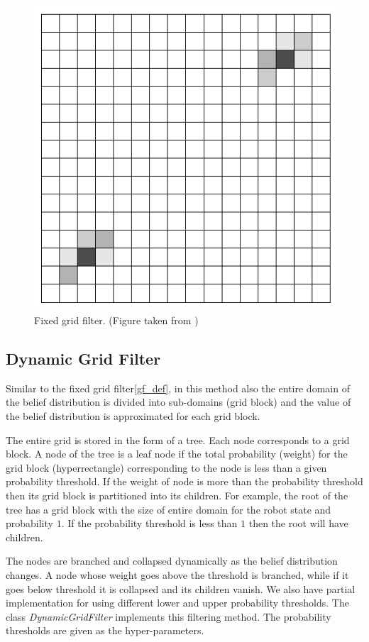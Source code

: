 \begin{figure}
\caption{Fixed grid filter. (Figure taken from \cite{prob})}
\includegraphics[width=\linewidth]{grid}
\end{figure}

\subsection{Dynamic Grid Filter}
Similar to the fixed grid filter\ref{gf_def}, in this method also the entire domain of the belief distribution is divided into sub-domains (grid block) and the value of the belief distribution is approximated for each grid block.

The entire grid is stored in the form of a tree. Each node corresponds to a grid block. A node of the tree is a leaf node if the total probability (weight) for the grid block (hyperrectangle) corresponding to the node is less than a given probability threshold. If the weight of node is more than the probability threshold then its grid block is partitioned into its children. For example, the root of the tree has a grid block with the size of entire domain for the robot state and probability $1$. If the probability threshold is less than $1$ then the root will have children.

The nodes are branched and collapsed dynamically as the belief distribution changes. A node whose weight goes above the threshold is branched, while if it goes below threshold it is collapsed and its children vanish. We also have partial implementation for using different lower and upper probability thresholds. The class \textit{DynamicGridFilter} implements this filtering method. The probability thresholds are given as the hyper-parameters.

